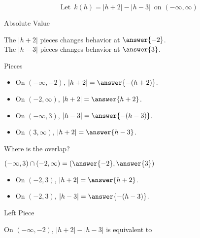 \documentclass{ximera}
\author{Lee Wayand}
\begin{document}
\[
\text{ Let } \, k(h) = |h+2| - |h-3| \, \text{ on } (-\infty, \infty)
\]







\begin{exercise} Absolute Value


The $|h+2|$ pieces changes behavior at $\answer{-2}$. \\

The $|h-3|$ pieces changes behavior at $\answer{3}$. \\

\end{exercise}










\begin{exercise} Pieces


\begin{itemize}
\item On $(-\infty, -2)$, $|h+2| = \answer{-(h+2)}$.
\item On $(-2, \infty)$, $|h+2| = \answer{h+2}$.
\item On $(-\infty, 3)$, $|h-3| = \answer{-(h-3)}$.
\item On $(3, \infty)$, $|h+2| = \answer{h-3}$.
\end{itemize}
Where is the overlap?


$(-\infty, 3) \cap (-2, \infty) = \left( \answer{-2}, \answer{3} \right)$ \\





\begin{itemize}
\item On $(-2,3)$, $|h+2| = \answer{h+2}$.
\item On $(-2,3)$, $|h-3| = \answer{-(h-3)}$.
\end{itemize}




\end{exercise}











\begin{exercise} Left Piece


On $(-\infty, -2)$, $|h+2| - |h-3|$ is equivalent to


\begin{multipleChoice}
\end{multipleChoice}

\end{exercise}
\end{document}
